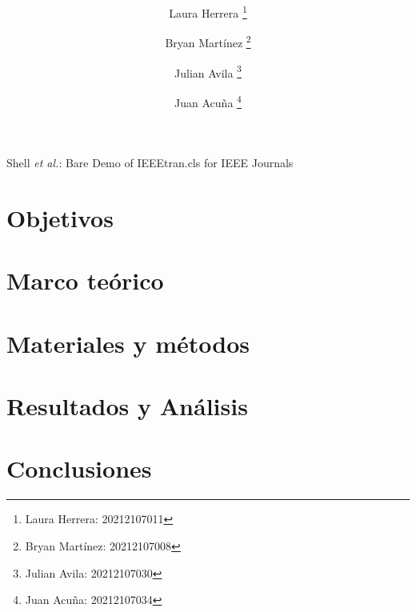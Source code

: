 \documentclass[journal, table]{IEEEtran}
\begin{document}
\title{\textbf{} \\
    \small{}}

\author[*]{Laura Herrera
    \thanks{Laura Herrera: 20212107011}}
\author[*]{Bryan Martínez
    \thanks{Bryan Martínez: 20212107008}}
\author[*]{Julian Avila
    \thanks{Julian Avila: 20212107030}}
\author[*]{Juan Acuña
    \thanks{Juan Acuña: 20212107034}}



\markboth{}
{Shell \MakeLowercase{\textit{et al.}}: Bare Demo of IEEEtran.cls for IEEE Journals}

\maketitle



\section{Objetivos}


\section{Marco teórico}


\section{Materiales y métodos}


\section{Resultados y Análisis}


\section{Conclusiones}

\printbibliography
\end{document}
